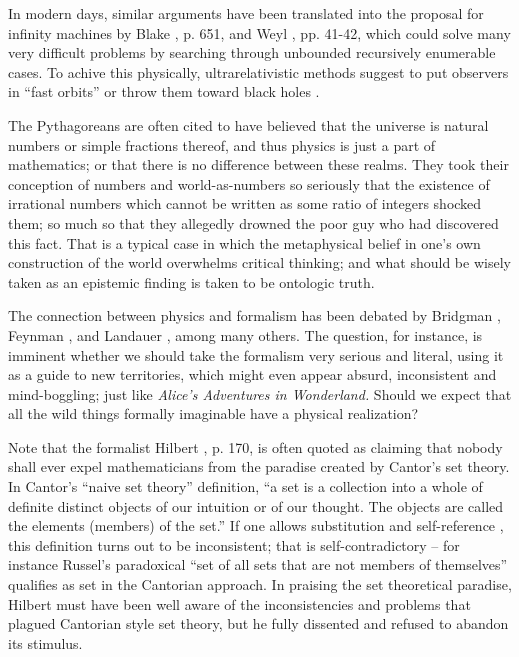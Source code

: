 In modern days, similar arguments have been translated into the proposal for
infinity machines  by
Blake \cite{Blake26}, p. 651,
and Weyl \cite{weyl:49}, pp. 41-42,
which could solve many very difficult problems by searching through unbounded recursively enumerable cases.
To achive this physically, ultrarelativistic methods suggest to put observers in ``fast orbits'' or throw them toward
black holes \cite{pit:90}.


The Pythagoreans are often cited to have believed that the universe is natural numbers or simple fractions thereof, and thus physics is just a part of mathematics; or that
there is no difference between these realms.
They took their conception of numbers and world-as-numbers so seriously that the existence of irrational numbers which cannot
be written as some ratio of integers shocked them; so much so that they allegedly drowned the poor guy who had discovered this fact.
That is a typical case in which the metaphysical belief in one's own construction of the world overwhelms critical thinking;
and what should be wisely taken as an epistemic finding is taken to be ontologic truth.

The connection between physics and formalism has been debated by
Bridgman \cite{bridgman},
Feynman \cite{feynman-computation},
and  Landauer \cite{landauer},
among many others.
The question, for instance, is imminent whether we should take the formalism very serious and literal,
using it as a guide to new territories, which might even appear absurd, inconsistent and mind-boggling;
just like {\em Alice's Adventures in Wonderland.}
Should we expect that all the wild things formally imaginable have a physical realization?

Note that the formalist Hilbert \cite{hilbert-26,cantor-set}, p. 170, is often quoted as claiming that
nobody shall  ever expel mathematicians from the paradise created by Cantor's set theory.
In Cantor's ``naive set theory'' definition,
``a set is a collection into a whole of definite distinct objects of
our intuition or of our thought. The objects are called the elements
(members) of the set.''
If one allows  substitution and self-reference \cite{smullyan-78,smullyan-92},
this definition turns out to be inconsistent; that is self-contradictory
--
for instance Russel's paradoxical ``set of all sets that are not members of themselves''
qualifies as set in the Cantorian approach.
In praising the set theoretical paradise, Hilbert must have been well aware of the inconsistencies
and problems that plagued Cantorian style set theory,
but he fully dissented and refused to abandon its stimulus.


